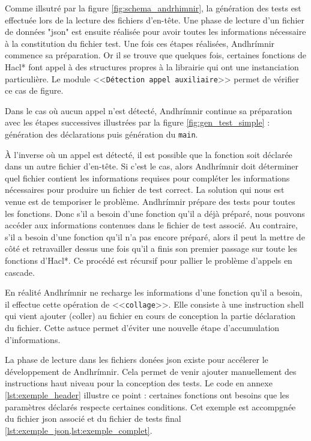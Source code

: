 Comme illsutré par la figure \ref{fig:schema_andrhimnir}, la génération des tests est effectuée lors de la lecture des fichiers d'en-tête. Une phase de lecture d'un fichier de données "json" est ensuite réalisée pour avoir toutes les informations nécessaire à la constitution du fichier test. Une fois ces étapes réalisées, Andhrímnir commence sa préparation. Or il se trouve que quelques fois, certaines fonctions de Hacl* font appel à des structures propres à la librairie qui ont une instanciation particulière. Le module <<\texttt{Détection appel auxiliaire}>> permet de vérifier ce cas de figure.\smallbreak

Dans le cas où aucun appel n'est détecté, Andhrímnir continue sa préparation avec les étapes successives illustrées par la figure \ref{fig:gen_test_simple} : génération des déclarations puis génération du \texttt{main}.\smallbreak

À l'inverse où un appel est détecté, il est possible que la fonction soit déclarée dans un autre fichier d'en-tête. Si c'est le cas, alors Andhrímnir doit déterminer quel fichier contient les informations requises pour compléter les informations nécessaires pour produire un fichier de test correct. La solution qui nous est venue est de temporiser le problème. Andhrímnir prépare des tests pour toutes les fonctions. Donc s'il a besoin d'une fonction qu'il a déjà préparé, nous pouvons accéder aux informations contenues dans le fichier de test associé. Au contraire, s'il a besoin d'une fonction qu'il n'a pas encore préparé, alors il peut la mettre de côté et retravailler dessus une fois qu'il a finis son premier passage sur toute les fonctions d'Hacl*. Ce procédé est récursif pour pallier le problème d'appels en cascade.\smallbreak

En réalité Andhrímnir ne recharge les informations d'une fonction qu'il a besoin, il effectue cette opération de <<\texttt{collage}>>. Elle consiste à une instruction shell qui vient ajouter (coller) au fichier en cours de conception la partie déclaration du fichier. Cette astuce permet d'éviter une nouvelle étape d'accumulation d'informations.\medbreak

La phase de lecture dans les fichiers donées json existe pour accélerer le développement de Andhrímnir. Cela permet de venir ajouter manuellement des instructions haut niveau pour la conception des tests. Le code en annexe \ref{lst:exemple_header} illustre ce point : certaines fonctions ont besoins que les paramètres déclarés respecte certaines conditions. Cet exemple est accompgnée du fichier json associé et du fichier de tests final \ref{lst:exemple_json,lst:exemple_complet}.  


